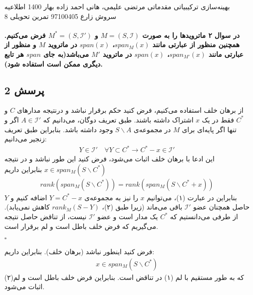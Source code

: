 \documentclass[a4paper,12pt]{article}
\newcounter{problemcounter}
\newcounter{subproblemcounter}
\newcommand{\problem}[1]
{
	\subsection*{
		پرسش
		#1
	}
}
\begin{document}
\handout
{بهینه‌سازی ترکیبیاتی مقدماتی}
{مرتضی علیمی، هانی احمد زاده}
{بهار 1400}
{اطلاعیه}
{سروش زارع}
{97100405}
 {تمرین تحویلی 8}
\paragraph{\color{blue}
در سوال ۲ ماتروید‌ها را به صورت
$M = (S, \mathcal{I})$
و
$M^* = (S, \mathcal{I'})$
فرض می‌کنیم. همچنین منظور از عبارتی مانند
$span_M(x)$،
$span(x)$
در ماتروید $M$ و منظور از عبارتی مانند
$span_{M'}(x)$،
$span(x)$
در ماتروید $M'$ می‌باشد(به جای
$span$
هر تابع دیگری ممکن است استفاده شود).
}
\problem{2}
از برهان خلف استفاده می‌کنیم، فرض کنید حکم برقرار نباشد و درنتیجه مدار‌های $C$ و $C^*$ فقط در یک $x$ اشتراک داشته باشند.
طبق تعریف دوگان، می‌دانیم که 
$A \in \mathcal{I'}$
 اگر و تنها اگر پایه‌ای برای $M$ در مجموعه‌ی 
 $S \backslash A$
  وجود داشته باشد. بنابراین طبق تعریف زنجیر می‌دانیم:
\begin{align}
	Y \in \mathcal{I'} \quad \forall Y \subset C^* \rightarrow C^* - x \in \mathcal{I'}
\end{align}
\proof{}
این ادعا با برهان خلف اثبات می‌شود، فرض کنید این طور نباشد و در نتیجه 
$x \in span_M(S \backslash C^*)	$
بنابراین  داریم
\begin{align}
	rank(span_M(S \backslash C^*)) = rank(span_M(S \backslash C^* + x))
\end{align}
بنابراین در عبارت (۱)، می‌توانیم $x$ را نیز به مجموعه‌ی 
$Y = C^* - x$
اضافه کنیم و $Y$ حاصل همچنان عضو $\mathcal{I'}$ باقی می‌ماند (زیرا طبق (۲)، 
$rank_M(S - Y)$
کاهش نمی‌یابد). از طرفی می‌دانستیم که $C^*$ یک مدار است و عضو $\mathcal{I'}$ نیست، از تناقض حاصل نتیجه می‌گیریم که فرض خلف باطل است و لم برقرار است.
\begin{latin}
	$\square$
\end{latin}

\proof{}
فرض کنید اینطور نباشد (برهان خلف). بنابراین داریم:
\begin{align*}
	x \in span_M(S \backslash C^* )
\end{align*}
که به طور مستقیم با لم (۱) در تناقض است. بنابراین فرض خلف باطل است و لم(۲) اثبات می‌شود.
\end{document}

